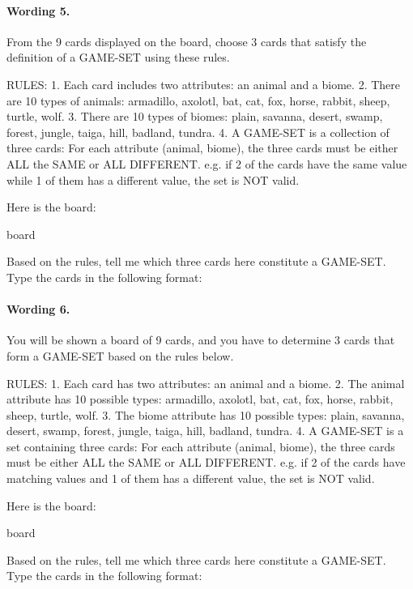 \paragraph{Wording 5.}
\begin{promptbox}
From the 9 cards displayed on the board, choose 3 cards that satisfy the definition of a GAME-SET using these rules.

RULES:
1. Each card includes two attributes: an animal and a biome.
2. There are 10 types of animals: armadillo, axolotl, bat, cat, fox, horse, rabbit, sheep, turtle, wolf.
3. There are 10 types of biomes: plain, savanna, desert, swamp, forest, jungle, taiga, hill, badland, tundra.
4. A GAME-SET is a collection of three cards: For each attribute (animal, biome), the three cards must be either ALL the SAME or ALL DIFFERENT. e.g. if 2 of the cards have the same value while 1 of them has a different value, the set is NOT valid.

Here is the board:

{board}

Based on the rules, tell me which three cards here constitute a GAME-SET. Type the cards in the following format:
\end{promptbox}

\paragraph{Wording 6.}
\begin{promptbox}
You will be shown a board of 9 cards, and you have to determine 3 cards that form a GAME-SET based on the rules below.

RULES:
1. Each card has two attributes: an animal and a biome.
2. The animal attribute has 10 possible types: armadillo, axolotl, bat, cat, fox, horse, rabbit, sheep, turtle, wolf.
3. The biome attribute has 10 possible types: plain, savanna, desert, swamp, forest, jungle, taiga, hill, badland, tundra.
4. A GAME-SET is a set containing three cards: For each attribute (animal, biome), the three cards must be either ALL the SAME or ALL DIFFERENT. e.g. if 2 of the cards have matching values and 1 of them has a different value, the set is NOT valid.

Here is the board:

{board}

Based on the rules, tell me which three cards here constitute a GAME-SET. Type the cards in the following format:
\end{promptbox}

